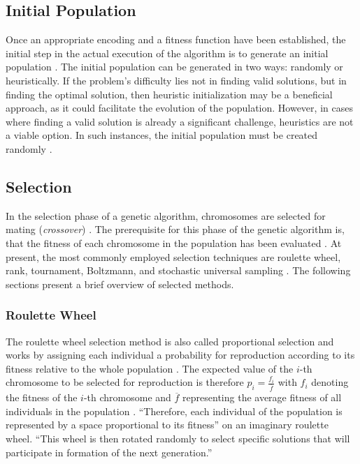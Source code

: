 \documentclass[sigconf]{acmart}
\begin{document}
\subsection{Initial Population}
Once an appropriate encoding and a fitness function have been established,
the initial step in the actual execution of the algorithm is to generate an
initial population \cite{Affenzeller2009}.
The initial population can be generated in two ways: randomly or heuristically.
If the problem's difficulty lies not in finding valid solutions, but in finding
the optimal solution, then heuristic initialization may be a beneficial
approach, as it could facilitate the evolution of the population.
However, in cases where finding a valid solution is already a significant
challenge, heuristics are not a viable option. In such instances, the initial
population must be created randomly \cite{Affenzeller2009}.

\subsection{Selection}
In the selection phase of a genetic algorithm, chromosomes are selected for
mating (\textit{crossover}) \cite{Affenzeller2009}.
The prerequisite for this phase of the genetic algorithm is, that the
fitness of each chromosome in the population has been evaluated
\cite{Affenzeller2009}.
At present, the most commonly employed selection techniques are roulette wheel,
rank, tournament, Boltzmann, and stochastic universal sampling
\cite{Katoch2021}.
The following sections present a brief overview of selected methods.

\subsubsection{Roulette Wheel}
The roulette wheel selection method is also called proportional selection
and works by assigning each individual a probability for reproduction according
to its fitness relative to the whole population \cite{Affenzeller2009}.
The expected value of the $i$-th chromosome to be selected for reproduction
is therefore $p_i = \frac{f_i}{\overline{f}}$ with $f_i$ denoting the fitness
of the $i$-th chromosome and $\overline{f}$ representing the average fitness
of all individuals in the population \cite{Affenzeller2009}.
\enquote{Therefore, each individual of the population is represented by a
space proportional to its fitness}\cite{Affenzeller2009} on an imaginary
roulette wheel.
\enquote{This wheel is then rotated randomly to select specific solutions that
will participate in formation of the next generation.} \cite{Katoch2021}
\end{document}
